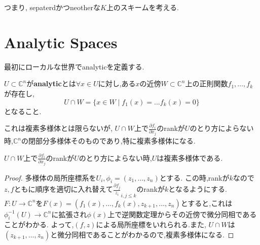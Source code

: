 つまり, sepaterdかつneotherな$K$上のスキームを考える.


\section{Analytic Spaces}
最初にローカルな世界でanalyticを定義する.
\begin{screen}
\begin{dfn}
$U \subset \mathbb{C}^n$が\textbf{analytic}とは$\forall x \in U$に対し,ある$x$の近傍$W \subset \mathbb{C}^n$上の正則関数$f_1, \ldots ,f_k$が存在し,
\begin{equation*}
  U \cap W = \{x \in W \mid f_1(x) = \ldots  f_k(x) = 0 \}
\end{equation*}
となること.
\end{dfn}
\end{screen}

これは複素多様体とは限らないが,
$U \cap W$上で$\frac{\partial f_i}{\partial x_j}$のrankが$U$のとり方によらない時,$\mathbb{C}^n$の閉部分多様体そのものであり,特に複素多様体になる.

\begin{lem}
$U \cap W$上で$\frac{\partial f_i}{\partial x_j}$のrankが$U$のとり方によらない時,$U$は複素多様体である.
\end{lem}
\begin{proof}
多様体の局所座標系を$U_i,\phi_i = (z_1,\ldots, z_n)$とする.
この時,rankが$k$なので$z,f$ともに順序を適切に入れ替えて$\frac{\partial f_j}{z_i}_{i,j \le k}$のrankが$k$となるようにする.
$F: U \to \mathbb{C}^n$を$F(x) = (f_1(x), \ldots, f_k(x), z_{k+1},\ldots, z_{n})$とすると,これは$\phi_i^{-1}(U) \to \mathbb{C}^n$に拡張され$\phi(x)$上で逆関数定理からその近傍で微分同相であることがわかる.
よって,$(f, z)$による局所座標をいれられる.また,
$U \cap W$は$(z_{k+1}, \ldots, z_n)$と微分同相であることがわかるので,複素多様体になる.
\end{proof}


